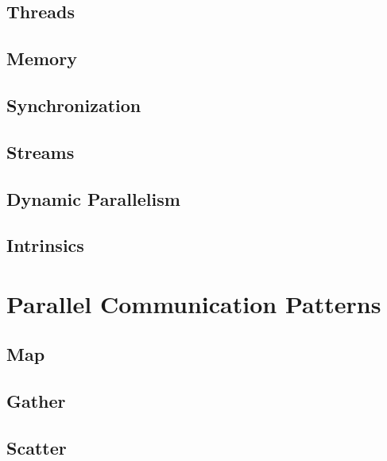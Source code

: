 \documentclass[12px,oz]{report}
\begin{document}
	\section{Threads}
	\label{sec-pm-threads}
	
	
	\section{Memory}
	\label{sec-pm-memory}
	
	
	\section{Synchronization}
	\label{sec-pm-synch}
	
	
	\section{Streams}
	\label{sec-pm-streams}
		
	
	\section{Dynamic Parallelism}
	\label{sec-pm-dynamic}
	
	
	\section{Intrinsics}
	\label{sec-pm-intrinsics}
	


\chapter{Parallel Communication Patterns}
\label{ch-patterns}

	
	\section{Map}
	\label{sec-map}
	
	
	\section{Gather}
	\label{sec-gather}
	
	
	\section{Scatter}
	\label{sec-scatter}
	
	
\end{document}
